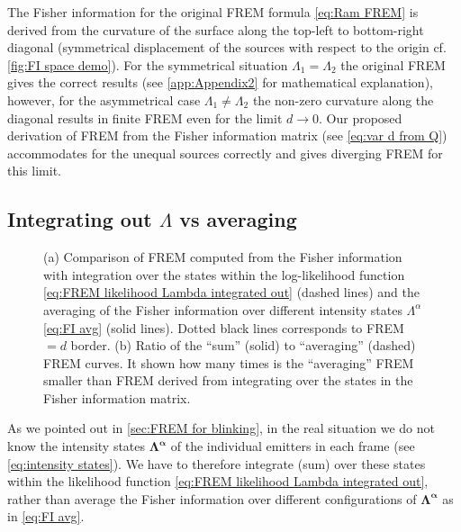 The Fisher information for the original FREM formula \autoref{eq:Ram FREM} is derived from the curvature of the surface along the top-left to bottom-right diagonal (symmetrical displacement of the sources with respect to the origin cf. \autoref{fig:FI space demo}). For the symmetrical situation $\Lambda_1=\Lambda_2$ the original FREM gives the correct results (see \autoref{app:Appendix2} for mathematical explanation), however, for the asymmetrical case $\Lambda_1\neq\Lambda_2$ the non-zero curvature along the diagonal results in finite FREM even for the limit $d\rightarrow 0$. Our proposed derivation of FREM from the Fisher information matrix (see \autoref{eq:var d from Q}) accommodates for the unequal sources correctly and gives diverging FREM for this limit. 


\subsection{Integrating out $\Lambda$ vs averaging\label{sub:Int out vs avg}}
\begin{figure}[!hbt]
	\centering
	\newcommand{\wf}{.49\textwidth}
		
		
	\caption{(a) Comparison of FREM computed from the Fisher information with integration over the states within the log-likelihood function \autoref{eq:FREM likelihood Lambda integrated out} (dashed lines) and the averaging of the Fisher information over different intensity states $\Lambda^{\alpha}$ \autoref{eq:FI avg} (solid lines). Dotted black lines corresponds to FREM$=d$ border. (b) Ratio of the ``sum'' (solid) to ``averaging'' (dashed) FREM curves. It shown how many times is the ``averaging'' FREM smaller than FREM derived from integrating over the states in the Fisher information matrix.}
	\label{fig:FREM int out vs avg}
\end{figure}
% 
As we pointed out in \autoref{sec:FREM for blinking}, in the real situation we do not know the intensity states $\bm{\Lambda^{\alpha}}$ of the individual emitters in each frame (see \autoref{eq:intensity states}). We have to therefore integrate (sum) over these states within the likelihood function \autoref{eq:FREM likelihood Lambda integrated out}, rather than average the Fisher information over different configurations of $\bm{\Lambda^{\alpha}}$ as in \autoref{eq:FI avg}. 


